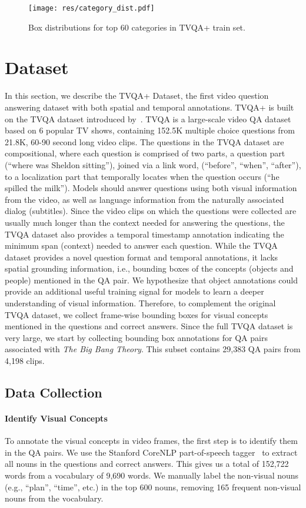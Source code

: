 \documentclass[11pt,a4paper]{article}
\begin{document}
\begin{figure*}[t]
\centering
  \texttt{[image: res/category\_dist.pdf]}
  \caption{Box distributions for top 60 categories in TVQA+ train set.}
  \label{fig:cat_dist}
\end{figure*} 


\section{Dataset}\label{dataset}
In this section, we describe the TVQA+ Dataset, the first video question answering dataset with both spatial and temporal annotations. 
TVQA+ is built on the TVQA dataset introduced by~\citeauthor{lei2018tvqa}. 
TVQA is a large-scale video QA dataset based on 6 popular TV shows, containing 152.5K multiple choice questions from 21.8K, 60-90 second long video clips. 
The questions in the TVQA dataset are compositional, where each question is comprised of two parts, a question part (``where was Sheldon sitting''), joined via a link word, (``before'', ``when'', ``after''), to a localization part that temporally locates when the question occurs (``he spilled the milk'').
Models should answer questions using both visual information from the video, as well as language information from the naturally associated dialog (subtitles).
Since the video clips on which the questions were collected are usually much longer than the context needed for answering the questions, the TVQA dataset also provides a temporal timestamp annotation indicating the minimum span (context) needed to answer each question. 
While the TVQA dataset provides a novel question format and temporal annotations, it lacks spatial grounding information, i.e., bounding boxes of the concepts (objects and people) mentioned in the QA pair. 
We hypothesize that object annotations could provide an additional useful training signal for models to learn a deeper understanding of visual information. 
Therefore, to complement the original TVQA dataset, we collect frame-wise bounding boxes for visual concepts mentioned in the questions and correct answers. 
Since the full TVQA dataset is very large, we start by collecting bounding box annotations for QA pairs associated with \textit{The Big Bang Theory}. 
This subset contains 29,383 QA pairs from 4,198 clips.


\subsection{Data Collection}
\paragraph{Identify Visual Concepts} 
To annotate the visual concepts in video frames, the first step is to identify them in the QA pairs. 
We use the Stanford CoreNLP part-of-speech tagger~\cite{manning-EtAl:2014:P14-5} to extract all nouns in the questions and correct answers. 
This gives us a total of 152,722 words from a vocabulary of 9,690 words. 
We manually label the non-visual nouns (e.g., ``plan'', ``time'', etc.) in the top 600 nouns, removing 165 frequent non-visual nouns from the vocabulary.
\end{document}
